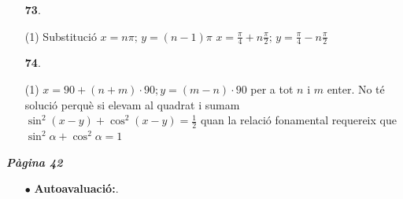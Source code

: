 \documentclass[a4paper, pdf, twoside]{book}
\begin{document}
\begin{multicols}{2}
\begin{enumerate}

 \item[\fontfamily{phv}\selectfont\color{blue}\textbf{73}. ] 
 \begin{tasks}[column-sep=1em, item-indent=1.3333em](1)
	 \task* Substitució $x=n\pi ;\,y=(n-1)\pi $
	 \task* $x=\frac {\pi }{4}+n\frac {\pi }{2};\,y=\frac {\pi }{4}-n\frac {\pi }{2}$
\end{tasks}
\vspace{0.25cm}



 \item[\fontfamily{phv}\selectfont\color{blue}\textbf{74}. ] 
 \begin{tasks}[column-sep=1em, item-indent=1.3333em](1)
	 \task* $x=90+(n+m)\cdot 90; y=(m-n)\cdot 90$
	 \task per a tot $n$ i $m$ enter.
	 \task* No té solució perquè si elevam al quadrat i sumam $\sin ^2 (x-y)+\cos ^2 (x-y)=\frac {1}{2}$
	 \task* quan la relació fonamental requereix que $\sin ^2 \alpha +\cos ^2 \alpha =1$
\end{tasks}
 \end{enumerate}
\vspace{0.3cm}


{\textbf{\em Pàgina 42}} \hrulefill
\begin{enumerate}
\vspace{0.25cm}
 \item[$\bullet$ ] {\selectfont\color{blue}\textbf{Autoavaluació:}. }

 \end{enumerate}
\begin{enumerate}
\vspace{0.25cm}




\end{enumerate}
\end{multicols}
\end{document}
